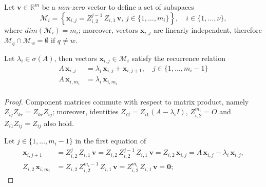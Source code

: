Let $\boldsymbol{v}\in\mathbb{R}^{m}$ be a \textit{non-zero} vector to
define a set of subspaces
\begin{displaymath}
\mathcal{M}_{i} = \left\lbrace \boldsymbol{x}_{i,j} = Z_{i,2}^{j-1}\,Z_{i,1}\,\boldsymbol{v},\,j\in\lbrace1,\ldots,m_{i}\rbrace\right\rbrace, \quad i\in \lbrace 1,\ldots,\nu \rbrace,
\end{displaymath}
where $dim(\mathcal{M}_{i})=m_{i}$; moreover, vectors $\boldsymbol{x}_{i,j}$ are
linearly independent, therefore $\mathcal{M}_{q}\cap\mathcal{M}_{w}=\emptyset$ if $q\neq w$.

\begin{lemma}
Let $\lambda_{i}\in\sigma(A)$, then vectors
$\boldsymbol{x}_{i,j}\in\mathcal{M}_{i}$ satisfy the recurrence relation
\begin{displaymath}
\begin{split}
A\,\boldsymbol{x}_{i,j} &= \lambda_{i}\,\boldsymbol{x}_{i,j} + \boldsymbol{x}_{i,j+1} , \quad j\in \lbrace 1,\ldots,m_{i}-1 \rbrace  \\
A\,\boldsymbol{x}_{i,m_{i}} &= \lambda_{i}\,\boldsymbol{x}_{i,m_{i}} \\
\end{split}
\end{displaymath}
\end{lemma}
\begin{proof}
Component matrices commute with respect to matrix product, namely
$Z_{ij}Z_{kr}= Z_{kr}Z_{ij}$; moreover, identities $Z_{i2} =
Z_{i1}(A-\lambda_{i}I)$, $Z_{i,2}^{m_{i}}=O$ and $Z_{i1}Z_{ij}=Z_{ij}$ also
hold.

Let $ j\in \lbrace 1,\ldots,m_{i}-1 \rbrace $ in the first equation of
\begin{displaymath}
\begin{split}
\boldsymbol{x}_{i,j+1} &= Z_{i,2}^{j}\,Z_{i,1}\,\boldsymbol{v} = Z_{i,2}\,Z_{i,2}^{j-1}\,Z_{i,1}\,\boldsymbol{v} =  Z_{i,2}\,\boldsymbol{x}_{i,j}=A\,\boldsymbol{x}_{i,j} - \lambda_{i}\,\boldsymbol{x}_{i,j},  \\
Z_{i,2}\,\boldsymbol{x}_{i,m_{i}} &=  Z_{i,2}\,Z_{i,2}^{m_{i}-1}\,Z_{i,1}\,\boldsymbol{v} = Z_{i,2}^{m_{i}}\,Z_{i,1}\,\boldsymbol{v} = \boldsymbol{0};
\end{split}
\end{displaymath}
\end{proof}

